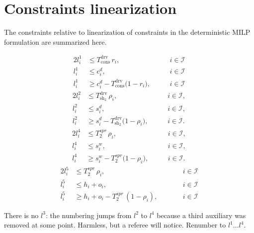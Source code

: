 \appendix
\section{Constraints linearization} \label{section:appendix1}
The constraints relative to linearization of constraints in the deterministic MILP formulation are summarized here.

\begin{alignat}{2}
    l_i^1 &\leq T^{\mathrm{drv}}_{\mathrm{cons}}\, r_i, &\quad& \, i \in \mathcal{I} \label{eq:l1_ub1}\\
    l_i^1 &\leq c_i^d, &\quad& \, i \in \mathcal{I} \label{eq:l1_ub2}\\
    l_i^1 &\geq c_i^d - T^{\mathrm{drv}}_{\mathrm{cons}}\bigl(1-r_i\bigr), &\quad& \, i \in \mathcal{I} \label{eq:l1_lb}
\end{alignat}
\begin{alignat}{2}
    l_i^2 &\leq T^{\mathrm{drv}}_{\mathrm{sh_2}}\, \rho_i, &\quad& \, i \in \mathcal{I}, \label{eq:l2_ub1}\\
    l_i^2 &\leq s_i^d, &\quad& \, i \in \mathcal{I}, \label{eq:l2_ub2}\\
    l_i^2 &\geq s_i^d - T^{\mathrm{drv}}_{\mathrm{sh_2}}\bigl(1-\rho_i\bigr), &\quad& \, i \in \mathcal{I}. \label{eq:l2_lb}
\end{alignat}
\begin{alignat}{2}
    l_i^4 &\leq T^{spr}_{2}\, \rho_i, &\quad& \, i \in \mathcal{I}, \label{eq:l4_ub1}\\
    l_i^4 &\leq s_i^w, &\quad& \, i \in \mathcal{I}, \label{eq:l4_ub2}\\
    l_i^4 &\geq s_i^w - T^{spr}_{2}\bigl(1-\rho_i\bigr), &\quad& \, i \in \mathcal{I}. \label{eq:l4_lb}
\end{alignat}
\begin{alignat}{2}
    l^5_i &\leq T^{spr}_2\, \rho_i, &\qquad& i \in \mathcal I \label{eq:l5_1}\\
    l^5_i &\leq h_i + o_i, &\qquad& i \in \mathcal I \label{eq:l5_2}\\
    l^5_i &\geq h_i + o_i - T^{spr}_2\,(1 - \rho_i), &\qquad& i \in \mathcal I \label{eq:l5_3}
\end{alignat}

\begin{acmt}
There is no $l^3$: the numbering jumps from $l^2$ to $l^4$ because a third
auxiliary was removed at some point. Harmless, but a referee will notice.
Renumber to $l^1 \ldots l^4$.
\end{acmt}

